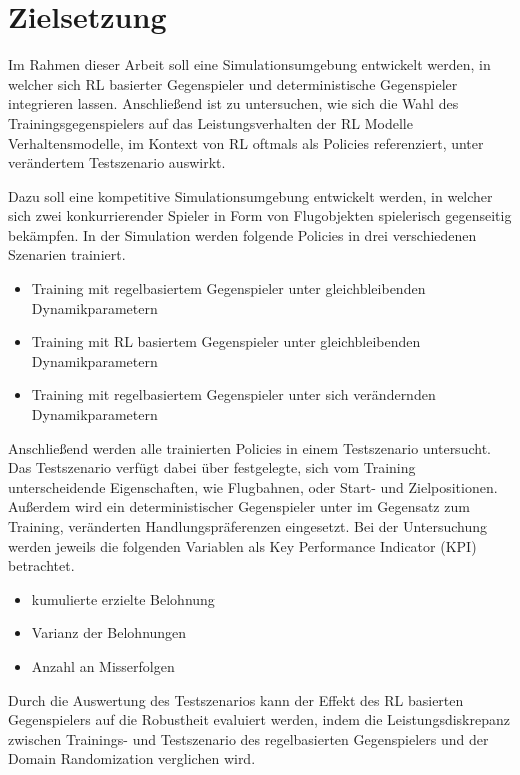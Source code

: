 \section{Zielsetzung}

Im Rahmen dieser Arbeit soll eine Simulationsumgebung entwickelt werden, in welcher sich RL basierter Gegenspieler und deterministische Gegenspieler integrieren lassen.
Anschließend ist zu untersuchen, wie sich die Wahl des Trainingsgegenspielers auf das Leistungsverhalten der RL Modelle Verhaltensmodelle, im Kontext von RL oftmals als Policies referenziert, unter verändertem Testszenario auswirkt.

Dazu soll eine kompetitive Simulationsumgebung entwickelt werden, in welcher sich zwei konkurrierender Spieler in Form von Flugobjekten spielerisch gegenseitig bekämpfen.
In der Simulation werden folgende Policies in drei verschiedenen Szenarien trainiert.

\begin{itemize}
    \item Training mit regelbasiertem Gegenspieler unter gleichbleibenden Dynamikparametern
    \item Training mit RL basiertem Gegenspieler unter gleichbleibenden Dynamikparametern
    \item Training mit regelbasiertem Gegenspieler unter sich verändernden Dynamikparametern
\end{itemize}

Anschließend werden alle trainierten Policies in einem Testszenario untersucht.
Das Testszenario verfügt dabei über festgelegte, sich vom Training unterscheidende Eigenschaften, wie Flugbahnen, oder Start- und Zielpositionen.
Außerdem wird ein deterministischer Gegenspieler unter im Gegensatz zum Training, veränderten Handlungspräferenzen eingesetzt.
Bei der Untersuchung werden jeweils die folgenden Variablen als Key Performance Indicator (KPI) betrachtet.
\begin{itemize}
    \item kumulierte erzielte Belohnung
    \item Varianz der Belohnungen
    \item Anzahl an Misserfolgen
\end{itemize}

Durch die Auswertung des Testszenarios kann der Effekt des RL basierten Gegenspielers auf die Robustheit evaluiert werden, indem die Leistungsdiskrepanz zwischen Trainings- und Testszenario des regelbasierten Gegenspielers und der Domain Randomization verglichen wird.

